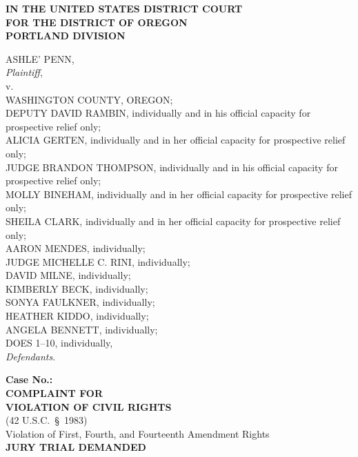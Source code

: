 \documentclass[12pt,letterpaper]{article}
\begin{document}
	\sloppy
	
	\singlespacing
	\begin{center}
		\textbf{IN THE UNITED STATES DISTRICT COURT}\\
		\textbf{FOR THE DISTRICT OF OREGON}\\
		\textbf{PORTLAND DIVISION}
	\end{center}
	
	\bigskip
	\noindent
	\begin{minipage}[t]{0.5\textwidth}
		ASHLE' PENN,\\
		\hspace*{1em}\textit{Plaintiff},\\[6pt]
		v.\\[6pt]
		WASHINGTON COUNTY, OREGON;\\
		DEPUTY DAVID RAMBIN, individually and in his official capacity
		for prospective relief only;\\
		ALICIA GERTEN, individually and in her official capacity
		for prospective relief only;\\
		JUDGE BRANDON THOMPSON, individually and in his official capacity
		for prospective relief only;\\
		MOLLY BINEHAM, individually and in her official capacity
		for prospective relief only;\\
		SHEILA CLARK, individually and in her official capacity
		for prospective relief only;\\
		AARON MENDES, individually;\\
		JUDGE MICHELLE C. RINI, individually;\\
		DAVID MILNE, individually;\\
		KIMBERLY BECK, individually;\\
		SONYA FAULKNER, individually;\\
		HEATHER KIDDO, individually;\\
		ANGELA BENNETT, individually;\\
		DOES 1--10, individually,\\[6pt]
		\hspace*{1em}\textit{Defendants}.
	\end{minipage}
	\hfill
	\begin{minipage}[t]{0.35\textwidth}
		\raggedright
		\textbf{Case No.:} \underline{\hspace{2in}}\\[12pt]
		\textbf{COMPLAINT FOR}\\
		\textbf{VIOLATION OF CIVIL RIGHTS}\\
		(42 U.S.C.\ \S\ 1983)\\[8pt]
		Violation of First, Fourth, and Fourteenth Amendment Rights\\[12pt]
		\textbf{JURY TRIAL DEMANDED}
	\end{minipage}
	
\end{document}
